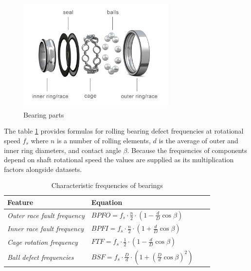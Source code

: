 \begin{figure}[h]
    \centering
    \includegraphics[width=0.7\textwidth]{assets/analysis/bearing-parts.jpg}
    \caption{Bearing parts~\cite{lu_what_is_ball_bearing_2023}}
    \label{fig:bearing-parts}
\end{figure}

The table \ref{tab:bearing-defect-features} provides formulas for rolling bearing defect frequencies at rotational speed $f_s$ where $n$ is a number of rolling elements, $d$ is the average of outer and inner ring diameters, and contact angle $\beta$. Because the frequencies of components depend on shaft rotational speed the values are supplied as its multiplication factors alongside datasets.

\begin{table}[h]
\centering
\renewcommand{\arraystretch}{2}
\begin{tabular}{|l|l|l|l|}
\hline
\textbf{Feature}            & \textbf{Equation}
 \\ \hline
\textit{Outer race fault frequency} & $ BPFO = f_s \cdot \frac{n}{2} \cdot \left(1 - \frac{d}{D}\cos \beta \right)$
\\ \hline
\textit{Inner race fault frequency} & $ BPFI = f_s \cdot \frac{n}{2} \cdot \left(1 + \frac{d}{D}\cos \beta \right)$
\\ \hline
\textit{Cage rotation frequency}    & $ FTF = f_s \cdot \frac{1}{2} \cdot \left(1 - \frac{d}{D}\cos \beta \right) $
\\ \hline
\textit{Ball defect frequencies} & $ BSF = f_s \cdot \frac{D}{d} \cdot \left(1 + \left(\frac{D}{d}\cos \beta\right)^2 \right) $
\\ \hline
\end{tabular}
\caption{Characteristic frequencies of bearings}
\label{tab:bearing-defect-features}
\end{table}

